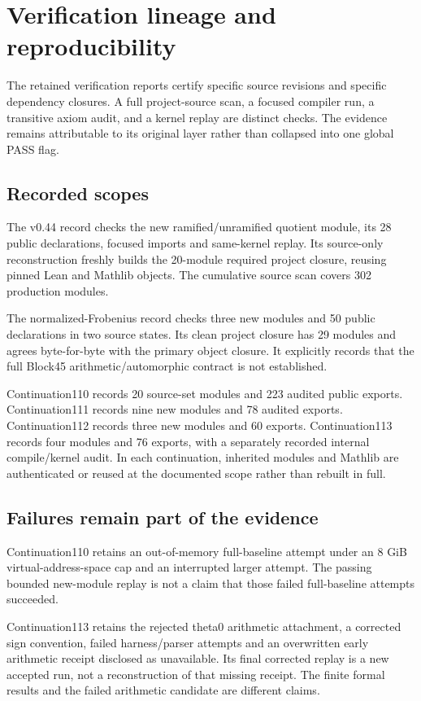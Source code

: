 \documentclass[10pt,oneside]{book}
\begin{document}
\chapter{Verification lineage and reproducibility}
The retained verification reports certify specific source revisions and specific dependency closures. A full project-source scan, a focused compiler run, a transitive axiom audit, and a kernel replay are distinct checks. The evidence remains attributable to its original layer rather than collapsed into one global PASS flag.

\section{Recorded scopes}
The v0.44 record checks the new ramified/unramified quotient module, its 28 public declarations, focused imports and same-kernel replay. Its source-only reconstruction freshly builds the 20-module required project closure, reusing pinned Lean and Mathlib objects. The cumulative source scan covers 302 production modules.

The normalized-Frobenius record checks three new modules and 50 public declarations in two source states. Its clean project closure has 29 modules and agrees byte-for-byte with the primary object closure. It explicitly records that the full Block45 arithmetic/automorphic contract is not established.

Continuation110 records 20 source-set modules and 223 audited public exports. Continuation111 records nine new modules and 78 audited exports. Continuation112 records three new modules and 60 exports. Continuation113 records four modules and 76 exports, with a separately recorded internal compile/kernel audit. In each continuation, inherited modules and Mathlib are authenticated or reused at the documented scope rather than rebuilt in full.

\section{Failures remain part of the evidence}
Continuation110 retains an out-of-memory full-baseline attempt under an 8 GiB virtual-address-space cap and an interrupted larger attempt. The passing bounded new-module replay is not a claim that those failed full-baseline attempts succeeded.

Continuation113 retains the rejected theta0 arithmetic attachment, a corrected sign convention, failed harness/parser attempts and an overwritten early arithmetic receipt disclosed as unavailable. Its final corrected replay is a new accepted run, not a reconstruction of that missing receipt. The finite formal results and the failed arithmetic candidate are different claims.
\end{document}
